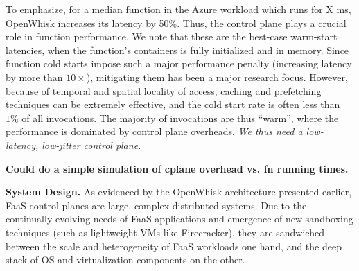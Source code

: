 To emphasize, for a median function in the Azure workload which runs for X ms, OpenWhisk increases its latency by 50\%. 
Thus, the control plane plays a crucial role in function performance.
We note that these are the best-case warm-start latencies, when the function's containers is fully initialized and in memory. 
Since function cold starts impose such a major performance penalty (increasing latency by more than $10\times$), mitigating them has been a major research focus. 
However, because of temporal and spatial locality of access, caching and prefetching techniques can be extremely effective, and the cold start rate is often less than $1\% $ of all invocations. 
The majority of invocations are thus ``warm'', where the performance is dominated by control plane overheads.
\emph{We thus need a low-latency, low-jitter control plane.}

\textbf{Could do a simple simulation of cplane overhead vs. fn running times.}

\noindent \textbf{System Design.}
%
As evidenced by the OpenWhisk architecture presented earlier, FaaS control planes are large, complex distributed systems.
Due to the continually evolving needs of FaaS applications and emergence of new sandboxing techniques (such as lightweight VMs like Firecracker), they are sandwiched between the scale and heterogeneity of FaaS workloads one hand, and the deep stack of OS and virtualization components on the other. 

